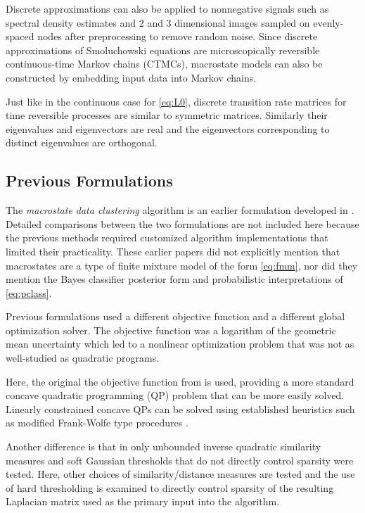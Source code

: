 \documentclass[10pt,letterpaper]{article}
\begin{document}
Discrete approximations can also be applied to nonnegative signals such as spectral density estimates and 2 and 3 dimensional images sampled on evenly-spaced nodes after preprocessing to remove random noise.
Since discrete approximations of Smoluchowski equations are microscopically reversible continuous-time Markov chains (CTMCs), macrostate models can also be constructed by embedding input data into Markov chains.

Just like in the continuous case for \eqref{eq:L0}, discrete transition rate matrices for time reversible processes are similar to symmetric matrices.
Similarly their eigenvalues and eigenvectors are real and the eigenvectors corresponding to distinct eigenvalues are orthogonal.
\subsection*{Previous Formulations}
The \emph{macrostate data clustering} algorithm is an earlier formulation developed in \cite{korenblum, white}.
Detailed comparisons between the two formulations are not included here because the previous methods required customized algorithm implementations that limited their practicality. %
These earlier papers did not explicitly mention that macrostates are a type of finite mixture model of the form \eqref{eq:fmm}, nor did they mention the Bayes classifier posterior form and probabilistic interpretations of \eqref{eq:pclass}.

Previous formulations used a different objective function and a different global optimization solver.
The objective function was a logarithm of the geometric mean uncertainty which led to a nonlinear optimization problem that was not as well-studied as quadratic programs.

Here, the original the objective function from \cite{shall96} is used, providing a more standard concave quadratic programming (QP) problem that can be more easily solved.
Linearly constrained concave QPs can be solved using established heuristics such as modified Frank-Wolfe type procedures \cite{pard93}.

Another difference is that in \cite{korenblum, white} only unbounded inverse quadratic similarity measures and soft Gaussian thresholds that do not directly control sparsity were tested.
Here, other choices of similarity/distance measures are tested and the use of hard thresholding is examined to directly control sparsity of the resulting Laplacian matrix used as the primary input into the algorithm.
\end{document}
